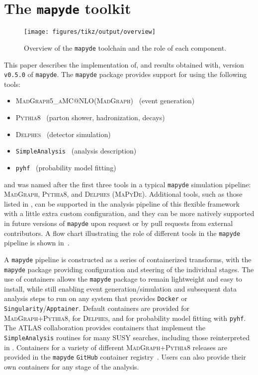 \documentclass{article}
\makeatletter
\newcommand{\mapyde}{\texttt{mapyde}}
\newcommand{\simpleanalysis}{\texttt{SimpleAnalysis}}
\newcommand{\madgraph}{\textsc{MadGraph}}
\newcommand{\madgraphfull}{\textsc{MadGraph5\_aMC@NLO}}
\newcommand{\pythia}{\textsc{Pythia8}}
\newcommand{\delphes}{\textsc{Delphes}}
\newcommand{\pyhf}{\texttt{pyhf}}
\newcommand{\docker}{\texttt{Docker}}
\newcommand{\singularity}{\texttt{Singularity}}
\newcommand{\apptainer}{\texttt{Apptainer}}
\makeatother
\begin{document}
\section{The \mapyde{} toolkit}
\label{sec:the-toolkit}

\begin{figure}[tbp]
	\centering
	\texttt{[image: figures/tikz/output/overview]}
	\caption{Overview of the \mapyde{} toolchain and the role of each component.}
	\label{fig:mapydeoverview}
\end{figure}

This paper describes the implementation of, and results obtained with, version \texttt{v0.5.0} of \mapyde.  The \mapyde{} package provides support for using the following tools:

\begin{itemize}
	\item \madgraphfull (\madgraph)~\cite{Alwall:2014hca,Frederix:2018nkq} (event generation)
	\item \pythia~\cite{Bierlich:2022pfr} (parton shower, hadronization, decays)
	\item \delphes~\cite{deFavereau:2013fsa,Selvaggi:2014mya,Mertens:2015kba} (detector simulation)
	\item \simpleanalysis~\cite{simpleanalysis,atlas_simpleanalysis} (analysis description)
	\item \pyhf~\cite{pyhf,pyhf_joss} (probability model fitting)
\end{itemize}

and was named after the first three tools in a typical \mapyde{} simulation pipeline: \madgraph, \pythia, and \delphes{} (\textsc{MaPyDe}).  Additional tools, such as those listed in , can be supported in the analysis pipeline of this flexible framework with a little extra custom configuration, and they can be more natively supported in future versions of \mapyde{} upon request or by pull requests from external contributors.  A flow chart illustrating the role of different tools in the \mapyde{} pipeline is shown in~.

A \mapyde{} pipeline is constructed as a series of containerized transforms, with the \mapyde{} package providing configuration and steering of the individual stages.  The use of containers allows the \mapyde{} package to remain lightweight and easy to install, while still enabling event generation/simulation and subsequent data analysis steps to run on any system that provides \docker{} or \singularity/\apptainer.  Default containers are provided for \madgraph+\pythia, for \delphes, and for probability model fitting with \pyhf.  The ATLAS collaboration provides containers that implement the \simpleanalysis{} routines for many SUSY searches, including those reinterpreted in .  Containers for a variety of different \madgraph+\pythia{} releases are provided in the \mapyde{} \texttt{GitHub} container registry~\cite{MapydeRegistry}.  Users can also provide their own containers for any stage of the analysis.
\end{document}
